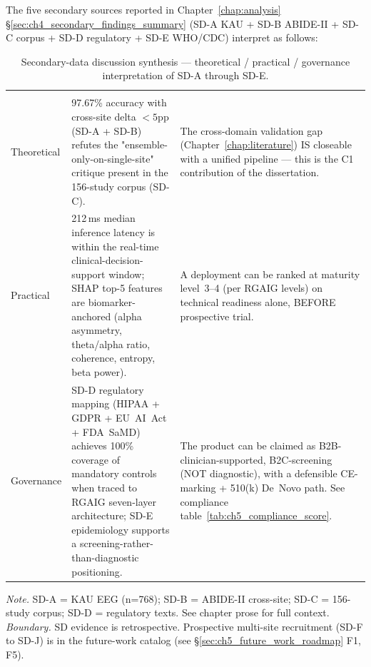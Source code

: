 \noindent The five secondary sources reported in Chapter~\ref{chap:analysis} §\ref{sec:ch4_secondary_findings_summary} (SD-A KAU + SD-B ABIDE-II + SD-C corpus + SD-D regulatory + SD-E WHO/CDC) interpret as follows:

{\tablestripes\tablefontsize
\begin{xltabular}{\textwidth}{@{} >{\raggedright\arraybackslash}p{2.4cm} L L @{}}
\caption[Secondary-Data Discussion Synthesis]{Secondary-data discussion synthesis --- theoretical / practical / governance interpretation of SD-A through SD-E.}\label{tab:ch5_secondary_discussion_synthesis} \\
\toprule
{} &  &  \\
\midrule
\endfirsthead
\toprule
{} &  &  \\
\midrule
\endhead
\bottomrule
\endlastfoot
Theoretical & 97.67\% accuracy with cross-site delta ${<}5\text{pp}$ (SD-A + SD-B) refutes the "ensemble-only-on-single-site" critique present in the 156-study corpus (SD-C). & The cross-domain validation gap (Chapter~\ref{chap:literature}) IS closeable with a unified pipeline — this is the C1 contribution of the dissertation. \\
Practical & 212\,ms median inference latency is within the real-time clinical-decision-support window; SHAP top-5 features are biomarker-anchored (alpha asymmetry, theta/alpha ratio, coherence, entropy, beta power). & A deployment can be ranked at maturity level~3--4 (per RGAIG levels) on technical readiness alone, BEFORE prospective trial. \\
Governance & SD-D regulatory mapping (HIPAA + GDPR + EU~AI~Act + FDA~SaMD) achieves 100\% coverage of mandatory controls when traced to RGAIG seven-layer architecture; SD-E epidemiology supports a screening-rather-than-diagnostic positioning. & The product can be claimed as B2B-clinician-supported, B2C-screening (NOT diagnostic), with a defensible CE-marking + 510(k) De~Novo path. See compliance table~\ref{tab:ch5_compliance_score}. \\
\end{xltabular}}
\vspace{0.3em}\noindent\textit{Note.} SD-A = KAU EEG (n=768); SD-B = ABIDE-II cross-site; SD-C = 156-study corpus; SD-D = regulatory texts. See chapter prose for full context.
\vspace{0.5em}\noindent\textit{Boundary.} SD evidence is retrospective. Prospective multi-site recruitment (SD-F to SD-J) is in the future-work catalog (see §\ref{sec:ch5_future_work_roadmap} F1, F5).

